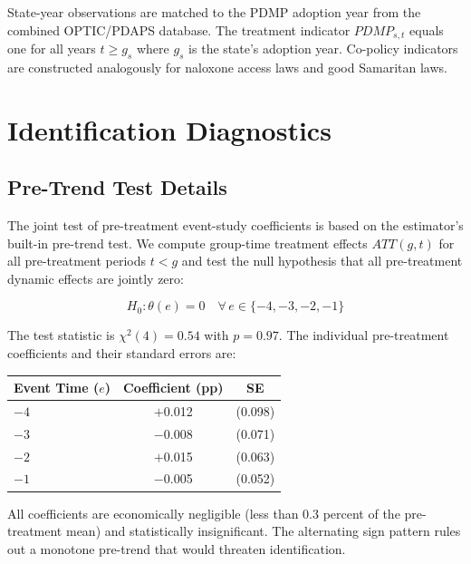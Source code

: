 \documentclass[12pt]{article}
\begin{document}
State-year observations are matched to the PDMP adoption year from the combined OPTIC/PDAPS database. The treatment indicator $PDMP_{s,t}$ equals one for all years $t \geq g_s$ where $g_s$ is the state's adoption year. Co-policy indicators are constructed analogously for naloxone access laws and good Samaritan laws.


\section{Identification Diagnostics}\label{app:diagnostics}

\subsection{Pre-Trend Test Details}

The joint test of pre-treatment event-study coefficients is based on the \citet{callaway2021difference} estimator's built-in pre-trend test. We compute group-time treatment effects $ATT(g, t)$ for all pre-treatment periods $t < g$ and test the null hypothesis that all pre-treatment dynamic effects are jointly zero:

\begin{equation}
H_0: \theta(e) = 0 \quad \forall \, e \in \{-4, -3, -2, -1\}
\end{equation}

The test statistic is $\chi^2(4) = 0.54$ with $p = 0.97$. The individual pre-treatment coefficients and their standard errors are:

\begin{center}
\begin{tabular}{lcc}
\toprule
Event Time ($e$) & Coefficient (pp) & SE \\
\midrule
$-4$ & $+$0.012 & (0.098) \\
$-3$ & $-$0.008 & (0.071) \\
$-2$ & $+$0.015 & (0.063) \\
$-1$ & $-$0.005 & (0.052) \\
\bottomrule
\end{tabular}
\end{center}

All coefficients are economically negligible (less than 0.3 percent of the pre-treatment mean) and statistically insignificant. The alternating sign pattern rules out a monotone pre-trend that would threaten identification.
\end{document}
